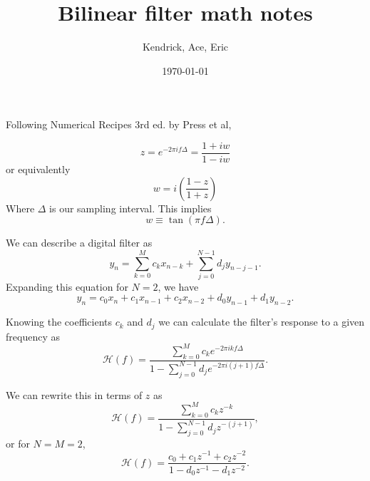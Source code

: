 \documentclass[a4paper]{article}
\title{Bilinear filter math notes}
\author{Kendrick, Ace, Eric}
\date{\today}
\begin{document}
\maketitle

Following Numerical Recipes 3rd ed. by Press et al,

\begin{equation}
z = e^{-2\pi i f \Delta} = \frac{1+iw}{1-iw} \label{eq:z}
\end{equation}
or equivalently
\begin{equation}
w = i \left(\frac{1-z}{1+z}\right) \label{eq:w}
\end{equation}
Where $\Delta$ is our sampling interval.
This implies
\begin{equation}
w \equiv \tan(\pi f \Delta).
\end{equation}

We can describe a digital filter as
\begin{equation}
y_n = \sum^{M}_{k=0} c_k x_{n-k} + \sum^{N-1}_{j=0} d_j y_{n-j-1}.
\end{equation}
Expanding this equation for $N=2$, we have
\begin{equation}
y_n = c_0 x_n + c_1 x_{n-1} + c_2 x_{n-2} + d_0 y_{n-1} + d_1 y_{n-2}.\label{eq:expanded_coeficients}
\end{equation}

Knowing the coefficients $c_k$ and $d_j$ we can calculate the filter's response to a given frequency as
\begin{equation}
\mathcal{H}(f) = \frac{\sum^{M}_{k=0} c_k e^{-2\pi i k f \Delta}}{1-\sum^{N-1}_{j=0} d_j e^{-2\pi i (j+1) f \Delta}}.
\end{equation}

We can rewrite this in terms of $z$ as
\begin{equation}
\mathcal{H}(f) = \frac{\sum^{M}_{k=0} c_k z^{-k}}{1-\sum^{N-1}_{j=0} d_j z^{-(j+1)}},
\end{equation}
or for $N=M=2$,
\begin{equation}
\mathcal{H}(f) = \frac{c_0 + c_1 z^{-1} + c_2 z^{-2}}{1 - d_0 z^{-1} - d_1 z^{-2}}.\label{eq:freq_response}
\end{equation}
\end{document}

